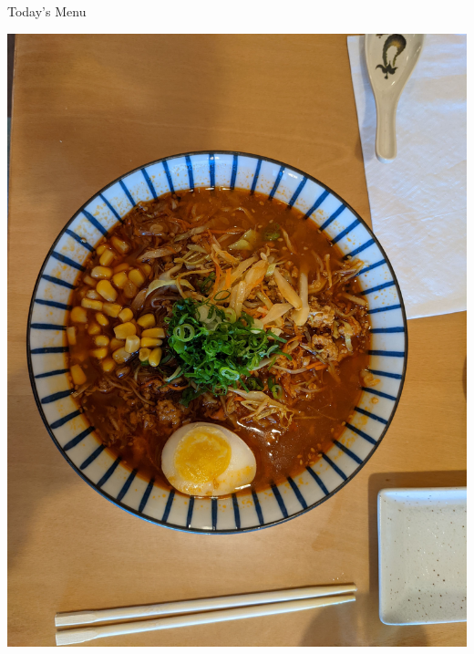 \documentclass{beamer}
\begin{document}
\begin{frame}{Today's Menu}
    \begin{minipage}[t][0.6\textheight]{0.6\textwidth}
        \vspace{0pt} 
        \tableofcontents[hideallsubsections]
    \end{minipage}
    \begin{minipage}[t]{0.35\textwidth} 
        \vspace{15pt}  
        \includegraphics[width=.9\textwidth]{ramen1.jpg}

\end{minipage}
\end{frame}
\end{document}
